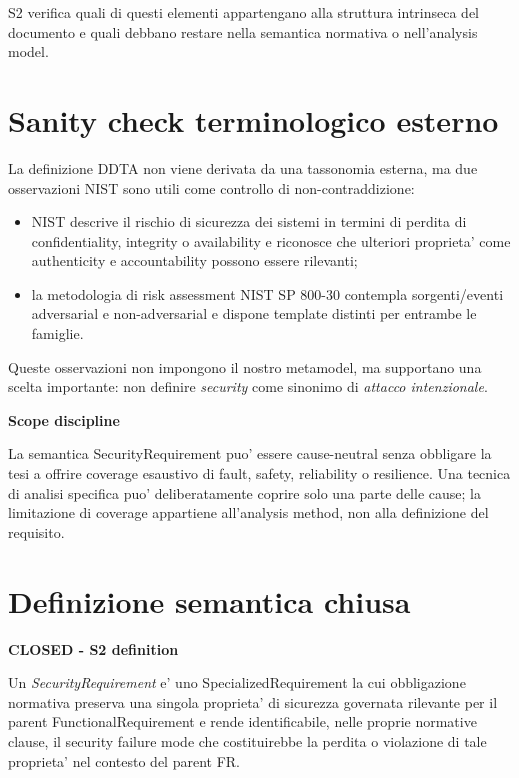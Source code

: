 \documentclass[11pt,a4paper]{article}
\newcommand{\closed}{\textbf{CLOSED}}
\newenvironment{resultbox}[1]{%
  \def\FrameCommand{\fcolorbox{ddtagreen}{ddtagray}}%
  \MakeFramed{\advance\hsize-2\width\FrameRestore}
  \noindent\textbf{#1}\par\smallskip
}{\endMakeFramed}
\newenvironment{warningbox}[1]{%
  \def\FrameCommand{\fcolorbox{ddtaorange}{ddtagray}}%
  \MakeFramed{\advance\hsize-2\width\FrameRestore}
  \noindent\textbf{#1}\par\smallskip
}{\endMakeFramed}
\begin{document}
S2 verifica quali di questi elementi appartengano alla struttura intrinseca del documento e quali debbano restare nella semantica normativa o nell'analysis model.

\section{Sanity check terminologico esterno}

La definizione DDTA non viene derivata da una tassonomia esterna, ma due osservazioni NIST sono utili come controllo di non-contraddizione:

\begin{itemize}
  \item NIST descrive il rischio di sicurezza dei sistemi in termini di perdita di confidentiality, integrity o availability e riconosce che ulteriori proprieta' come authenticity e accountability possono essere rilevanti;
  \item la metodologia di risk assessment NIST SP 800-30 contempla sorgenti/eventi adversarial e non-adversarial e dispone template distinti per entrambe le famiglie.
\end{itemize}

Queste osservazioni non impongono il nostro metamodel, ma supportano una scelta importante: non definire \emph{security} come sinonimo di \emph{attacco intenzionale}.

\begin{warningbox}{Scope discipline}
La semantica SecurityRequirement puo' essere cause-neutral senza obbligare la tesi a offrire coverage esaustivo di fault, safety, reliability o resilience. Una tecnica di analisi specifica puo' deliberatamente coprire solo una parte delle cause; la limitazione di coverage appartiene all'analysis method, non alla definizione del requisito.
\end{warningbox}

\section{Definizione semantica chiusa}

\begin{resultbox}{\closed{} - S2 definition}
Un \emph{SecurityRequirement} e' uno SpecializedRequirement la cui obbligazione normativa preserva una singola proprieta' di sicurezza governata rilevante per il parent FunctionalRequirement e rende identificabile, nelle proprie normative clause, il security failure mode che costituirebbe la perdita o violazione di tale proprieta' nel contesto del parent FR.
\end{resultbox}
\end{document}
